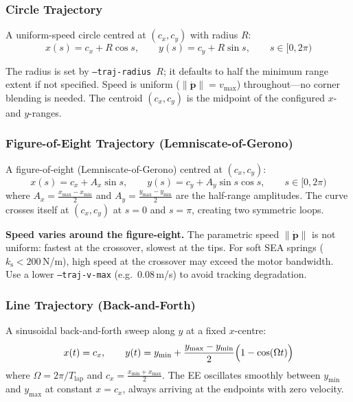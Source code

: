 \documentclass[11pt,a4paper]{article}
\newcommand{\ks}{k_{\mathrm{s}}}
\begin{document}
\subsubsection{Circle Trajectory}
\label{sec:traj_circle}

A uniform-speed circle centred at $(c_x, c_y)$ with radius $R$:
\begin{equation}
    x(s) = c_x + R\cos s, \qquad y(s) = c_y + R\sin s, \qquad s \in [0, 2\pi)
\label{eq:traj_circle}
\end{equation}

The radius is set by \texttt{--traj-radius $R$}; it defaults to half the
minimum range extent if not specified.  Speed is uniform
($\|\dot{\bm{p}}\| = v_{\max}$) throughout---no corner blending is needed.
The centroid $(c_x, c_y)$ is the midpoint of the configured $x$- and
$y$-ranges.

\subsubsection{Figure-of-Eight Trajectory (Lemniscate-of-Gerono)}
\label{sec:traj_fig8}

A figure-of-eight (Lemniscate-of-Gerono) centred at $(c_x, c_y)$:
\begin{equation}
    x(s) = c_x + A_x\sin s, \qquad
    y(s) = c_y + A_y\sin s\cos s, \qquad s \in [0, 2\pi)
\label{eq:traj_fig8}
\end{equation}
where $A_x = \tfrac{x_{\max}-x_{\min}}{2}$ and
$A_y = \tfrac{y_{\max}-y_{\min}}{2}$ are the half-range amplitudes.
The curve crosses itself at $(c_x, c_y)$ at $s = 0$ and $s = \pi$,
creating two symmetric loops.

\begin{warnbox}
\textbf{Speed varies around the figure-eight.}
The parametric speed $\|\dot{\bm{p}}\|$ is not uniform: fastest at the
crossover, slowest at the tips.  For soft SEA springs ($\ks < 200$\,N/m),
high speed at the crossover may exceed the motor bandwidth.  Use a lower
\texttt{--traj-v-max} (e.g.\ 0.08\,m/s) to avoid tracking degradation.
\end{warnbox}

\subsubsection{Line Trajectory (Back-and-Forth)}
\label{sec:traj_line}

A sinusoidal back-and-forth sweep along $y$ at a fixed $x$-centre:
\begin{equation}
    x(t) = c_x, \qquad
    y(t) = y_{\min} + \frac{y_{\max} - y_{\min}}{2}\Bigl(1 - \cos(\Omega t)\Bigr)
\label{eq:traj_line}
\end{equation}
where $\Omega = 2\pi / T_{\mathrm{lap}}$ and
$c_x = \tfrac{x_{\min}+x_{\max}}{2}$.
The EE oscillates smoothly between $y_{\min}$ and $y_{\max}$ at constant
$x = c_x$, always arriving at the endpoints with zero velocity.
\end{document}
